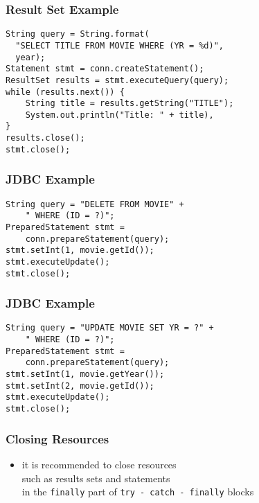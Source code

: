 \documentclass[dvipsnames]{beamer}
\theoremstyle{plain}
\begin{document}
\begin{frame}[fragile]
  \frametitle{Result Set Example}

  \begin{example}
    \begin{lstlisting}
String query = String.format(
  "SELECT TITLE FROM MOVIE WHERE (YR = %d)",
  year);
Statement stmt = conn.createStatement();
ResultSet results = stmt.executeQuery(query);
while (results.next()) {
    String title = results.getString("TITLE");
    System.out.println("Title: " + title),
}
results.close();
stmt.close();
    \end{lstlisting}
  \end{example}
\end{frame}

\begin{frame}[fragile]
  \frametitle{JDBC Example}

  \begin{example}[deleting]
    \begin{lstlisting}
String query = "DELETE FROM MOVIE" +
    " WHERE (ID = ?)";
PreparedStatement stmt =
    conn.prepareStatement(query);
stmt.setInt(1, movie.getId());
stmt.executeUpdate();
stmt.close();
    \end{lstlisting}
  \end{example}
\end{frame}

\begin{frame}[fragile]
  \frametitle{JDBC Example}

  \begin{example}[updating]
    \begin{lstlisting}
String query = "UPDATE MOVIE SET YR = ?" +
    " WHERE (ID = ?)";
PreparedStatement stmt =
    conn.prepareStatement(query);
stmt.setInt(1, movie.getYear());
stmt.setInt(2, movie.getId());
stmt.executeUpdate();
stmt.close();
    \end{lstlisting}
  \end{example}
\end{frame}

\begin{frame}
  \frametitle{Closing Resources}

  \begin{itemize}
    \item it is recommended to close resources\\
      such as results sets and statements\\
      in the \lstinline!finally! part
      of \lstinline!try - catch - finally! blocks
  \end{itemize}
\end{frame}
\end{document}
